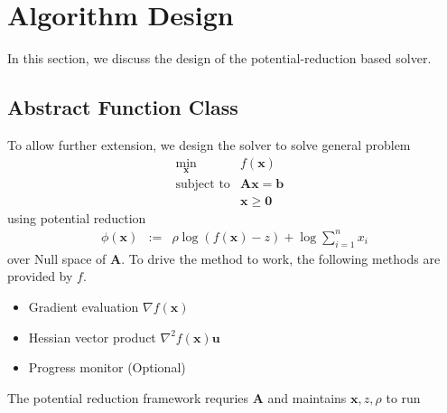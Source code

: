 \documentclass{article}
\newcommand{\assign}{:=}
\newcommand{\x}{\mathbf{x}}
\newcommand{\A}{\mathbf{A}}
\newcommand{\0}{\textbf{0}}
\newcommand{\n}{\nabla}
\newcommand{\tmb}{\mathbf{b}}
\newcommand{\tmu}{\mathbf{u}}
\begin{document}
\section{Algorithm Design}

In this section, we discuss the design of the potential-reduction based
solver.

\subsection{Abstract Function Class}

To allow further extension, we design the solver to solve general problem
\begin{eqnarray*}
  \min_{\x} & f \left( \x \right) & \\
  \text{subject to} & \A \x = \tmb & \\
  & \x \geq \0 & 
\end{eqnarray*}
using potential reduction
\begin{eqnarray*}
  \phi \left( \x \right) & \assign & \rho \log \left( f \left( \x \right) - z
  \right) + \log \sum_{i = 1}^n x_i
\end{eqnarray*}
over Null space of $\A$. To drive the method to work, the following methods
are provided by $f$.
\begin{itemize}
  \item Gradient evaluation $\nabla f \left( \x \right)$
  
  \item Hessian vector product $\n^2 f \left( \x \right) \tmu$
  
  \item Progress monitor (Optional)
\end{itemize}
The potential reduction framework requries $\A$ and maintains $\x, z, \rho$ to
run
\end{document}
